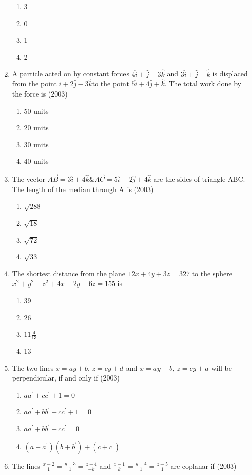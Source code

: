 \documentclass[12pt]{article}
\providecommand{\brak}[1]{\ensuremath{\left(#1\right)}}
\begin{document}
\begin{enumerate}
\begin{enumerate}
\item 3
\item 0
\item 1
\item 2
\end{enumerate}
\item  A particle acted on by constant forces $4\hat{i}+\hat{j}-3\hat{k}$ and $3\hat{i}+\hat{j}-\hat{k}$ is displaced from the point $\hat{i}+2\hat{j}-3\hat{k}$to the point $5\hat{i}+4\hat{j}+\hat{k}$. The total work done by the force is (2003)
\begin{enumerate}
\item 50 units
\item 20 units
\item 30 units
\item 40 units
\end{enumerate}
\item The vector $\overrightarrow{AB}=3\hat{i}+4\hat{k} \& \overrightarrow{AC}= 5\hat{i}-2\hat{j}+4\hat{k}$ are the sides of triangle ABC. The length of the median through A is (2003)
\begin{enumerate}
\item $\sqrt{288}$
\item $\sqrt{18}$
\item $\sqrt{72}$
\item $\sqrt{33}$
\end{enumerate}
\item The shortest distance from the plane $12x+4y+3z=327$ to the sphere $x^2+y^2+z^2+4x-2y-6z=155$ is
\begin{enumerate}
\item 39
\item 26 
\item $11\frac{4}{13}$
\item 13
\end{enumerate}
\item The two lines $x=ay+b$, $z=cy+d$ and $x=a^{}y+b^{}$, $z=c^{}y+a^{}$ will be perpendicular, if and only if (2003)
\begin{enumerate}
\item $aa^{'}+cc^{'}+1=0$
\item $aa^{'}+bb^{'}+cc^{'}+1=0$
\item $aa^{'}+bb^{'}+cc^{'}=0$
\item $\brak{a+a^{'}}\brak{b+b^{'}}+\brak{c+c^{'}}$
\end{enumerate}
\item The lines $\frac{x-2}{1}=\frac{y-3}{1}=\frac{z-4}{-k}$ and $\frac{x-1}{k}=\frac{y-4}{1}=\frac{z-5}{1}$ are coplanar if (2003)

\end{enumerate}
\end{document}
